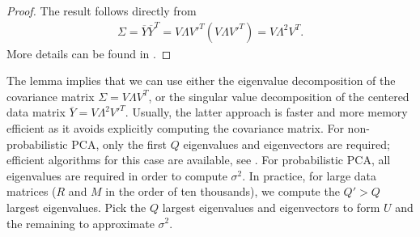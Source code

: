 \begin{proof}
  The result follows directly from
  \begin{align}
    \Sigma = \overline{Y}\overline{Y}^T = V\Lambda V'^T (V\Lambda V'^T) = V \Lambda^2 V^T.
  \end{align}
  More details can be found in \cite[Section~1.16]{MagnusNeudecker:1999}.
\end{proof}

The lemma implies that we can use either the eigenvalue decomposition
of the covariance matrix $\Sigma = V \Lambda V^T$, or the singular value
decomposition of the centered data matrix $\overline{Y} = V \Lambda^2 V'^T$.
Usually, the latter approach is faster
and more memory efficient as it avoids explicitly computing the
covariance matrix. For non-probabilistic PCA, only the first $Q$ eigenvalues
and eigenvectors are required; efficient algorithms for this case are available,
\eg see \cite{GolubVanLoan:2013}. For probabilistic PCA, all eigenvalues are
required in order to compute $\sigma^2$.
In practice, for large data matrices (\eg $R$ and $M$ in the order of ten thousands),
we compute the $Q' > Q$ largest eigenvalues. Pick the $Q$ largest eigenvalues
and eigenvectors to form $U$ and the remaining to approximate $\sigma^2$.
